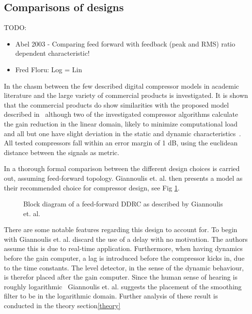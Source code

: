 \documentclass[../main2.tex]{subfiles}
\providecommand{\rootdir}{..}
\begin{document}
\subsection{Comparisons of designs}
TODO:
\begin{itemize}
\item Abel 2003 - Comparing feed forward with feedback (peak and RMS) ratio dependent characteristic!
\item Fred Floru: Log = Lin
\end{itemize}
In \cite{bitzer2006parameter} the chasm between the few described digital compressor models in academic literature and the large variety of commercial products is investigated. It is shown that the commercial products do show similarities with the proposed model described in~\cite{mcnally1984dynamic}\cite{zolzer1997digital}\cite{dafx} although two of the investigated compressor algorithms calculate the gain reduction in the linear domain, likely to minimize computational load and all but one have slight deviation in the static and dynamic characteristics~\cite{bitzer2006parameter}. All tested compressors fall within an error margin of 1 dB, using the euclidean distance between the signals as metric.

In \cite{reiss2012tutorial} a thorough formal comparison between the different design choices is carried out, assuming feed-forward topology. Giannoulis et. al.  then presents a model as their recommended choice for compressor design, see Fig \ref{fig:block_giannoulis}.
\begin{figure}
\centerline{}
\caption{Block diagram of a feed-forward DDRC as described by Giannoulis et. al.}
\label{fig:block_giannoulis}
\end{figure}
There are some notable features regarding this design to account for. To begin with Giannoulis et. al. discard the use of a delay with no motivation. The authors assume this is due to real-time application. Furthermore, when having dynamics before the gain computer, a lag is introduced before the compressor kicks in, due to the time constants. The level detector, in the sense of the dynamic behaviour, is therefor placed after the gain computer. Since the human sense of hearing is roughly logarithmic~\cite{fastl2007psychoacoustics} Giannoulis et. al. suggests the placement of the smoothing filter to be in the logarithmic domain. Further analysis of these result is conducted in the theory section\ref{theory}
 
\end{document}
